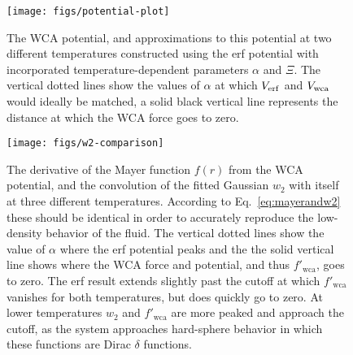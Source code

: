\documentclass[letterpaper,twocolumn,amsmath,amssymb,prb]{revtex4-1}
\begin{document}
\begin{figure}
\begin{center}
\texttt{[image: figs/potential-plot]}
\end{center}
\caption{The WCA potential, 
   and approximations to this potential
   at two different temperatures constructed using the erf potential 
   with incorporated temperature-dependent parameters $\alpha$ and $\Xi$. 
   The vertical dotted lines show the values of $\alpha$ at
   which $V_{\mathrm{erf}}$ and $V_{\mathrm{wca}}$ would ideally be matched, a solid black vertical 
   line represents the distance at which the WCA force goes to zero. }
\label{fig:potential-plot}
\end{figure}


\begin{figure}
\begin{center}
\texttt{[image: figs/w2-comparison]}
\end{center}
\caption{The derivative of the Mayer function $f(r)$ from the WCA
  potential, and the convolution of the fitted Gaussian $w_2$ with
  itself at three different temperatures. According to
  Eq.~\ref{eq:mayerandw2} these should be identical in order to
  accurately reproduce the low-density behavior of the fluid.
  The vertical dotted lines
  show the value of $\alpha$ where the erf potential peaks and
  the the solid vertical line shows where the WCA force and potential,
  and thus $f'_{\mathrm{wca}}$, goes to zero. 
  The erf result extends slightly past the cutoff at which 
  $f'_{\mathrm{wca}}$ vanishes for
  both temperatures, but does quickly go to zero. 
  At lower temperatures $w_2$ and $f'_{\mathrm{wca}}$ are more 
  peaked and approach the cutoff, as
  the system approaches hard-sphere behavior in which these functions
  are Dirac $\delta$ functions. }
\label{fig:w2-comparison}
\end{figure}
\end{document}
